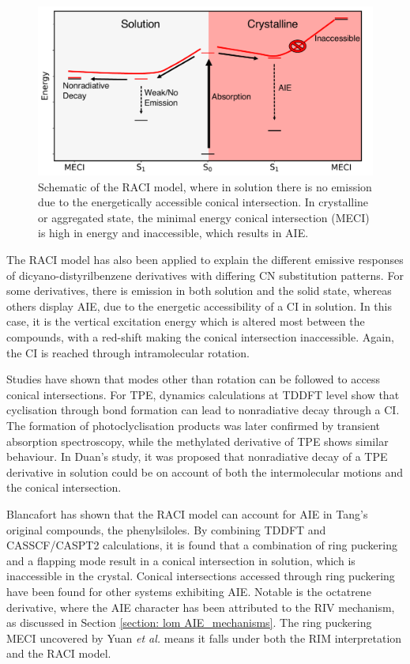 \begin{figure}[t]
\centering
  \includegraphics[width=0.9\linewidth]{1Intro/RACI_Model.pdf}
  \caption[Schematic of the RACI Model]{Schematic of the RACI model, where in solution there is no emission due to the energetically accessible conical intersection. In crystalline or aggregated state, the minimal energy conical intersection (MECI) is high in energy and inaccessible, which results in AIE.}
  \label{figure: RACI}
\end{figure}

The RACI model has also been applied to explain the different emissive responses of dicyano-distyrilbenzene derivatives with differing CN substitution patterns.\cite{Shi2017} For some derivatives, there is emission in both solution and the solid state, whereas others display AIE, due to the energetic accessibility of a CI in solution. In this case, it is the vertical excitation energy which is altered most between the compounds, with a red-shift making the conical intersection inaccessible. Again, the CI is reached through intramolecular rotation.

Studies have shown that modes other than rotation can be followed to access conical intersections. For \ac{TPE}, dynamics calculations at TDDFT level show that cyclisation through bond formation can lead to nonradiative decay through a CI.\cite{Prlj2016} The formation of photoclyclisation products was later confirmed by transient absorption spectroscopy, while the methylated derivative of \ac{TPE} shows similar behaviour.\cite{Cai2018a,Gao2017} In Duan's study, it was proposed that nonradiative decay of a TPE derivative in solution could be on account of both the intermolecular motions and the conical intersection.\cite{Duan2017} 

Blancafort has shown that the RACI model can account for AIE in Tang's original compounds, the phenylsiloles.\cite{Peng2016} By combining TDDFT and CASSCF/CASPT2 calculations, it is found that a combination of ring puckering and a flapping mode result in a conical intersection in solution, which is inaccessible in the crystal. Conical intersections accessed through ring puckering have been found for other systems exhibiting AIE.\cite{Sasaki2016} Notable is the octatrene derivative, where the AIE character has been attributed to the \ac{RIV} mechanism, as discussed in Section \ref{section: lom AIE_mechanisms}. \cite{Nishiuchi2013} The ring puckering \ac{MECI} uncovered by Yuan \textit{et al.} means it falls under both the \ac{RIM} interpretation and the \ac{RACI} model.\cite{Yuan2013}


